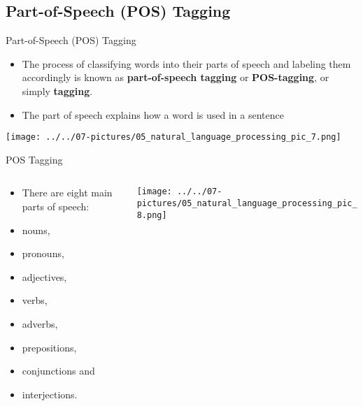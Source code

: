 \documentclass[11pt]{beamer}
\begin{document}
\subsection{Part-of-Speech (POS) Tagging \\ \scalebox{0.8}{}}
\begin{frame}{Part-of-Speech (POS) Tagging}
	\begin{itemize}
		\item The process of classifying words into their parts of speech and labeling them accordingly is known as \textbf{part-of-speech tagging} or  \textbf{ POS-tagging}, or simply  \textbf{ tagging}.
		\item The part of speech explains how a word is used in a sentence
	\end{itemize}
	\begin{center}
	\texttt{[image: ../../07-pictures/05\_natural\_language\_processing\_pic\_7.png]}
	\end{center}
\end{frame}
\begin{frame}{POS Tagging}
\begin{columns}[T] %
\begin{column}{.48\textwidth}
        \begin{itemize}
		\item There are eight main parts of speech: 
		\item nouns, 
		\item pronouns, 
		\item adjectives, 
		\item verbs, 
		\item adverbs, 
		\item prepositions, 
		\item conjunctions and 
		\item interjections.
        \end{itemize}
\end{column}%
\hfill%
\begin{column}{.48\textwidth}
        \texttt{[image: ../../07-pictures/05\_natural\_language\_processing\_pic\_8.png]}
\end{column}%
\end{columns}
\end{frame}
\end{document}
